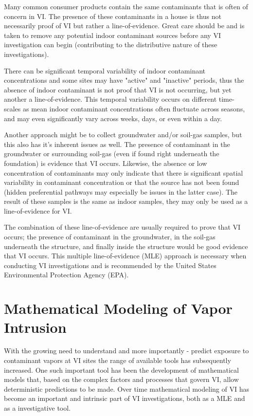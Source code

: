 \documentclass[../thesis.tex]{subfiles}
\begin{document}
Many common consumer products contain the same contaminants that is often of concern in VI.
The presence of these contaminants in a house is thus not necessarily proof of VI but rather a line-of-evidence.
Great care should be and is taken to remove any potential indoor contaminant sources before any VI investigation can begin (contributing to the distributive nature of these investigations).

There can be significant temporal variability of indoor contaminant concentrations and some sites may have "active" and "inactive" periods, thus the absence of indoor contaminant is not proof that VI is not occurring, but yet another a line-of-evidence.
This temporal variability occurs on different time-scales as mean indoor contaminant concentrations often fluctuate across seasons, and may even significantly vary across weeks, days, or even within a day.

Another approach might be to collect groundwater and/or soil-gas samples, but this also has it's inherent issues as well.
The presence of contaminant in the groundwater or surrounding soil-gas (even if found right underneath the foundation) is evidence that VI occurs.
Likewise, the absence or low concentration of contaminants may only indicate that there is significant spatial variability in contaminant concentration or that the source has not been found (hidden preferential pathways may especially be issues in the latter case).
The result of these samples is the same as indoor samples, they may only be used as a line-of-evidence for VI.

The combination of these line-of-evidence are usually required to prove that VI occurs; the presence of contaminant in the groundwater, in the soil-gas underneath the structure, and finally inside the structure would be good evidence that VI occurs.
This multiple line-of-evidence (MLE) approach is necessary when conducting VI investigations and is recommended by the United States Environmental Protection Agency (EPA).

\section{Mathematical Modeling of Vapor Intrusion}

With the growing need to understand and more importantly - predict exposure to contaminant vapors at VI sites the range of available tools has subsequently increased.
One such important tool has been the development of mathematical models that, based on the complex factors and processes that govern VI, allow deterministic predictions to be made.
Over time mathematical modeling of VI has become an important and intrinsic part of VI investigations, both as a MLE and as a investigative tool.\par
\end{document}
